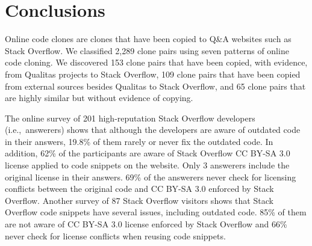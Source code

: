 \documentclass[10pt,journal,compsoc]{IEEEtran}
\begin{document}
%

\section{Conclusions}

Online code clones are clones that have been copied to Q\&A websites
such as Stack Overflow. 
We classified 2,289 clone pairs using seven patterns of online code cloning. We
discovered 153 clone pairs that have been copied, with evidence, from Qualitas
projects to Stack Overflow, 109 clone pairs that have been copied from external
sources besides Qualitas to Stack Overflow, and 65 clone pairs that are highly
similar but without evidence of copying.

The online survey of 201 high-reputation Stack Overflow developers
(i.e.,~answerers) shows that although the developers are aware of outdated code
in their answers, 19.8\% of them rarely or never fix the outdated code. In
addition, 62\% of the participants are aware of Stack Overflow CC BY-SA 3.0
license applied to code snippets on the website. Only 3 answerers include the
original license in their answers. 69\% of the answerers never check for
licensing conflicts between the original code and CC BY-SA 3.0 enforced by Stack
Overflow. Another survey of 87 Stack Overflow visitors shows that Stack Overflow
code snippets have several issues, including outdated code. 85\% of them are not
aware of CC BY-SA 3.0 license enforced by Stack Overflow and 66\% never check
for license conflicts when reusing code snippets.
\end{document}
